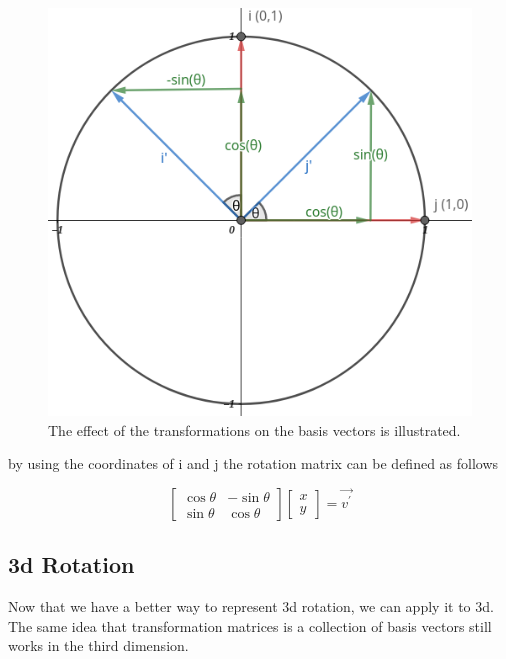 \begin{figure}[ht]\centering %
	\includegraphics[width=\columnwidth]{images/GeogebraVis.png}
	\caption{The effect of the transformations on the basis vectors is illustrated.}
	\label{fig:TransformationDiagram}
\end{figure}

by using the coordinates of i and j the rotation matrix can be defined as follows

\begin{equation}
	\begin{bmatrix} \cos{\theta} & -\sin{\theta} \\ \sin{\theta} & \cos{\theta} \end{bmatrix}\begin{bmatrix} x \\ y \end{bmatrix} = \vec{v^{\prime}}
\end{equation}

\subsection{3d Rotation}
\hspace{\parindent}%
Now that we have a better way to represent 3d rotation, we can apply it to 3d. The same idea that transformation matrices is a collection of basis vectors still works in the third dimension. 

